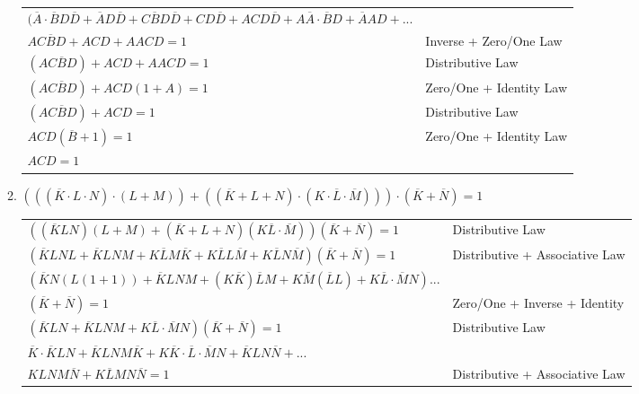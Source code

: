 \documentclass{article}
\begin{document}
\begin{enumerate}
\begin{enumerate}
\begin{tabular}{l l}
                $(\overline{A} \cdot \overline{B}D\overline{D} + \overline{A}D\overline{D} + C\overline{B}D\overline{D} + CD\overline{D} + ACD\overline{D} + A\overline{A}\cdot \overline{B}D + \overline{A}AD +$...\\ $AC\overline{B}D + ACD + AACD = 1$ & Inverse + Zero/One Law\\
                $(AC\overline{B}D) + ACD + AACD = 1$ & Distributive Law\\
                $(AC\overline{B}D) + ACD(1 + A) = 1$ & Zero/One + Identity Law\\
                $(AC\overline{B}D) + ACD = 1$ & Distributive Law\\
                $ACD(\overline{B} + 1) = 1$ & Zero/One + Identity Law\\
                $ACD = 1$
            \end{tabular}
            \begin{center}
            \end{center}
            \item $(((\overline{K} \cdot L \cdot N) \cdot (L+M)) + ((\overline{K} + L + N) \cdot (K \cdot \overline{L} \cdot \overline{M}))) \cdot (\overline{K} + \overline{N}) = 1$\\[0.25in]
            \begin{tabular}{l l}
                $((\overline{K}LN)(L+M) + (\overline{K}+L+N)(K\overline{L}\cdot \overline{M}))(\overline{K} + \overline{N}) = 1$ & Distributive Law\\
                $(\overline{K}LNL + \overline{K}LNM + K\overline{L}M\overline{K} + K\overline{L}L\overline{M} + K\overline{L}N\overline{M})(\overline{K} + \overline{N}) = 1$ & Distributive + Associative Law\\
                $(\overline{K}N(L(1+1)) + \overline{K}LNM + (K\overline{K})\overline{L}M + K\overline{M}(\overline{L}L) + K\overline{L} \cdot \overline{M}N)$...\\$(\overline{K} + \overline{N}) = 1$ & Zero/One + Inverse + Identity\\
                $(\overline{K}LN + \overline{K}LNM + K\overline{L} \cdot \overline{M}N)(\overline{K} + \overline{N}) = 1$ & Distributive Law\\
                $\overline{K} \cdot \overline{K}LN + \overline{K}LNM\overline{K} + K\overline{K}\cdot\overline{L}\cdot\overline{M}N + \overline{K}LN\overline{N} +$...\\ $KLNM\overline{N} + K\overline{L}MN\overline{N} = 1$ & Distributive + Associative Law\\

\end{tabular}
\end{enumerate}
\end{enumerate}
\end{document}
